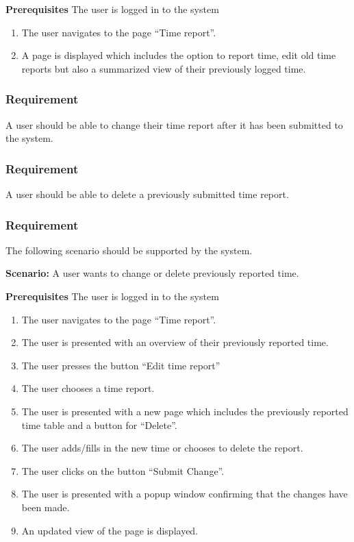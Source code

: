 \documentclass{article}
\begin{document}
\textbf{Prerequisites} The user is logged in to the system
\begin{enumerate}


\item The user navigates to the page “Time report”.
\item A page is displayed which includes the option to report time, edit old time reports but also a summarized view of their previously logged time. 
\end{enumerate}

\subsubsection{Requirement}
A user should be able to change their time report after it has been submitted to the system.
\subsubsection{Requirement}
A user should be able to delete a previously submitted time report.
\subsubsection{Requirement}
The following scenario should be supported by the system.

\textbf{Scenario:} A user wants to change or delete previously reported time.

\textbf{Prerequisites} The user is logged in to the system

\begin{enumerate}

\item The user navigates to the page “Time report”.
\item The user is presented with an overview of their previously reported time. 
\item The user presses the button “Edit time report”
\item The user chooses a time report.
\item The user is presented with a new page which includes the previously reported time table and a button for “Delete”. 
\item The user adds/fills in the new time or chooses to delete the report.
\item The user clicks on the button “Submit Change”.
\item The user is presented with a popup window confirming that the changes have been made.  
\item An updated view of the page is displayed.

\end{enumerate}
\end{document}

